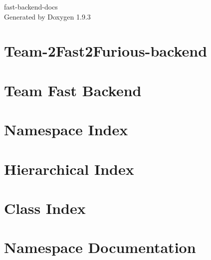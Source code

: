 \documentclass[twoside]{book}
\newcommand{\+}{\discretionary{\mbox{\scriptsize$\hookleftarrow$}}{}{}}
\newcommand{\clearemptydoublepage}{%
    \newpage{\pagestyle{empty}\cleardoublepage}%
  }
\begin{document}
  \raggedbottom
    \hypersetup{pageanchor=false,
                bookmarksnumbered=true,
                pdfencoding=unicode
               }
  \begin{titlepage}
  \vspace*{7cm}
  \begin{center}%
  {\Large fast-\/backend-\/docs}\\
  \vspace*{1cm}
  {\large Generated by Doxygen 1.9.3}\\
  \end{center}
  \end{titlepage}
  \clearemptydoublepage
  \tableofcontents
  \clearemptydoublepage
  \hypersetup{pageanchor=true}
\chapter{Team-\/2\+Fast2\+Furious-\/backend}
\label{md__r_e_a_d_m_e}

\chapter{Team Fast Backend}
\label{md__r_e_a_d_m_e__previous__team}

\chapter{Namespace Index}

\chapter{Hierarchical Index}

\chapter{Class Index}

\chapter{Namespace Documentation}






\end{document}
